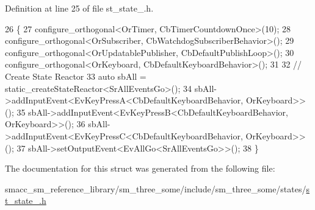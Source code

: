 Definition at line 25 of file st\+\_\+state\+\_.\+h.


\begin{DoxyCode}
26     \{
27         configure\_orthogonal<OrTimer, CbTimerCountdownOnce>(10);
28         configure\_orthogonal<OrSubscriber, CbWatchdogSubscriberBehavior>();
29         configure\_orthogonal<OrUpdatablePublisher, CbDefaultPublishLoop>();
30         configure\_orthogonal<OrKeyboard, CbDefaultKeyboardBehavior>();
31 
32         \textcolor{comment}{// Create State Reactor}
33         \textcolor{keyword}{auto} sbAll = static\_createStateReactor<SrAllEventsGo>();
34         sbAll->addInputEvent<EvKeyPressA<CbDefaultKeyboardBehavior, OrKeyboard>>();
35         sbAll->addInputEvent<EvKeyPressB<CbDefaultKeyboardBehavior, OrKeyboard>>();
36         sbAll->addInputEvent<EvKeyPressC<CbDefaultKeyboardBehavior, OrKeyboard>>();
37         sbAll->setOutputEvent<EvAllGo<SrAllEventsGo>>();
38     \}
\end{DoxyCode}


The documentation for this struct was generated from the following file\+:\begin{DoxyCompactItemize}
\item 
smacc\+\_\+sm\+\_\+reference\+\_\+library/sm\+\_\+three\+\_\+some/include/sm\+\_\+three\+\_\+some/states/\hyperlink{sm__three__some_2include_2sm__three__some_2states_2st__state__2_8h}{st\+\_\+state\+\_.\+h}\end{DoxyCompactItemize}
